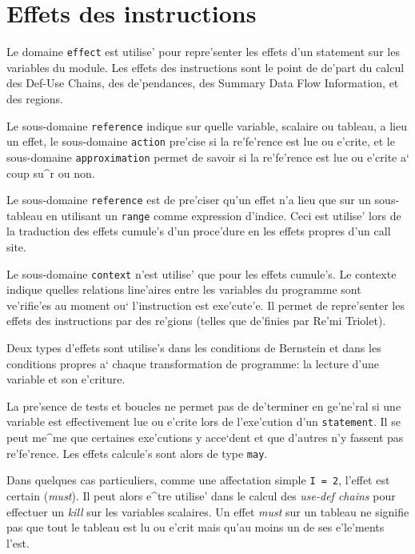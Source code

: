 \section{Effets des instructions}
\label{effects}

{}

{
Le domaine \verb/effect/ est utilise' pour repre'senter les effets d'un
statement sur les variables du module. Les effets des instructions sont
le point de de'part du calcul des Def-Use Chains, des de'pendances, des
Summary Data Flow Information, et des regions.

Le sous-domaine {\tt reference} indique sur quelle variable, scalaire ou
tableau, a lieu un effet, le sous-domaine {\tt action} pre'cise si la
re'fe'rence est lue ou e'crite, et le sous-domaine {\tt approximation}
permet de savoir si la re'fe'rence est lue ou e'crite a` coup su^r ou
non.

Le sous-domaine {\tt reference} est de pre'ciser qu'un effet n'a lieu
que sur un sous-tableau en utilisant un {\tt range} comme expression
d'indice. Ceci est utilise' lors de la traduction des effets cumule's
d'un proce'dure en les effets propres d'un call site.

Le sous-domaine {\tt context} n'est utilise' que pour les effets
cumule's. Le contexte indique quelles relations line'aires entre les
variables du programme sont ve'rifie'es au moment ou` l'instruction est
exe'cute'e.  Il permet de repre'senter les effets des instructions par
des re'gions (telles que de'finies par Re'mi Triolet).
}

{
Deux types d'effets sont utilise's dans les conditions de Bernstein
et dans les conditions propres a` chaque transformation de programme:
la lecture d'une variable et son e'criture.
}

{
La pre'sence de tests et boucles ne permet pas de de'terminer en ge'ne'ral
si une variable est effectivement lue ou e'crite lors de l'exe'cution
d'un {\tt statement}. Il se peut me^me que certaines exe'cutions
y acce`dent et que d'autres n'y fassent pas re'fe'rence. Les effets
calcule's sont alors de type {\tt may}.

Dans quelques cas particuliers, comme une affectation simple {\tt I = 2},
l'effet est certain ({\em must}). Il peut alors e^tre utilise' dans
le calcul des {\em use-def chains} pour effectuer un {\em kill} sur les
variables scalaires. Un effet {\em must} sur un tableau ne signifie pas
que tout le tableau est lu ou e'crit mais qu'au moins un de ses
e'le'ments l'est.
}

